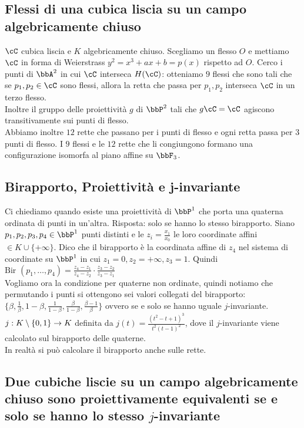 \documentclass[a4paper,NoNotes,GeneralMath]{stdmdoc}
\begin{document}
	\subsection*{Flessi di una cubica liscia su un campo algebricamente chiuso}
	$\cC$ cubica liscia e $K$ algebricamente chiuso. Scegliamo un flesso $O$ e mettiamo $\cC$ in forma di Weierstrass $y^2 = x^3 + ax + b = p(x)$ rispetto ad $O$. Cerco i punti di $\bbA^2$ in cui $\cC$ interseca $H(\cC)$: otteniamo $9$ flessi che sono tali che se $p_1, p_2 \in \cC$ sono flessi, allora la retta che passa per $p_1, p_2$ interseca $\cC$ in un terzo flesso. \\
	Inoltre il gruppo delle proiettività $g$ di $\bbP^2$ tali che $g \cC = \cC$ agiscono transitivamente sui punti di flesso. \\
	Abbiamo inoltre $12$ rette che passano per i punti di flesso e ogni retta passa per $3$ punti di flesso. I $9$ flessi e le $12$ rette che li congiungono formano una configurazione isomorfa al piano affine su $\bbF_3$.
	
	\subsection*{Birapporto, Proiettività e j-invariante}
	Ci chiediamo quando esiste una proiettività di $\bbP^1$ che porta una quaterna ordinata di punti in un'altra. Risposta: solo se hanno lo stesso birapporto. Siano $p_1, p_2, p_3, p_4 \in \bbP^1$ punti distinti e le $z_i = \frac{x_1}{x_0}$ le loro coordinate affini $\in K \cup \{ +\infty \}$. Dico che il birapporto è la coordinata affine di $z_4$ nel sistema di coordinate su $\bbP^1$ in cui $z_1 = 0, z_2 = +\infty, z_3 = 1$. Quindi $\text{Bir }(p_1, \ldots, p_4) = \frac{z_4 - z_1}{z_4 - z_2} \cdot \frac{z_3 - z_2}{z_3 - z_1}$ \\
	Vogliamo ora la condizione per quaterne non ordinate, quindi notiamo che permutando i punti si ottengono sei valori collegati del birapporto: $\{ \beta, \frac{1}{\beta}, 1-\beta , \frac{1}{1-\beta}, \frac{\beta}{1-\beta}, \frac{\beta - 1}{\beta} \}$ ovvero se e solo se hanno uguale $j$-invariante. $j: K \setminus \{0, 1\} \rightarrow K$ definita da $j(t) = \frac{(t^2 - t + 1)^3}{t^2 (t-1)^2}$, dove il $j$-invariante viene calcolato sul birapporto delle quaterne. \\
	In realtà si può calcolare il birapporto anche sulle rette.
	
	\subsection*{Due cubiche liscie su un campo algebricamente chiuso sono proiettivamente equivalenti se e solo se hanno lo stesso $j$-invariante}
	
\end{document}
